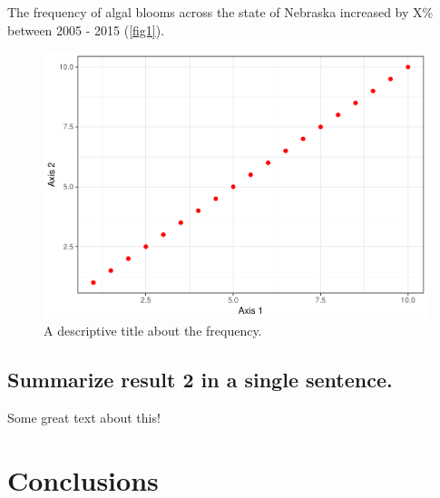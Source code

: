\documentclass[11pt,]{article}
\makeatletter
\def\maxwidth{\ifdim\Gin@nat@width>\linewidth\linewidth
\else\Gin@nat@width\fi}
\let\Oldincludegraphics\includegraphics
\renewcommand{\includegraphics}[1]{\Oldincludegraphics[width=\maxwidth]{#1}}
\makeatother
\begin{document}
The frequency of algal blooms across the state of Nebraska increased by
X\% between 2005 - 2015 (\autoref{fig1}).

\begin{figure}[htbp]
\centering
\includegraphics{wickham-thesis_files/figure-latex/fig1-1.pdf}
\caption{A descriptive title about the frequency. \label{fig1}}
\end{figure}

\subsection{Summarize result 2 in a single
sentence.}\label{summarize-result-2-in-a-single-sentence.}

Some great text about this!

\section{Conclusions}\label{conclusions}
\newpage
\singlespacing 
\renewcommand\refname{References}

\end{document}
